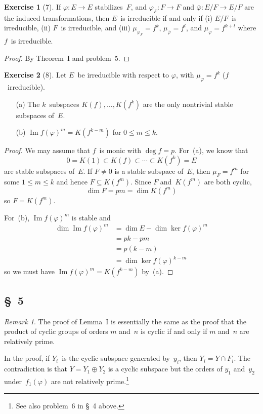 \documentclass[letterpaper,12pt]{article}
\DeclareMathOperator{\im}{Im}
\newcommand{\sect}{\cap}
\newcommand{\dsum}{\oplus}
\newcommand{\proj}[1]{\overline{#1}}
\theoremstyle{definition}
\newtheorem*{exer}{Exercise}
\theoremstyle{remark}
\newtheorem*{rmk}{Remark}
\begin{document}
\begin{exer}[7]
If \(\varphi:E\to E\) stabilizes~\(F\), and \(\varphi_F:F\to F\) and \(\proj{\varphi}:E/F\to E/F\) are the induced transformations, then \(E\)~is irreducible if and only if (i) \(E/F\)~is irreducible, (ii) \(F\)~is irreducible, and (iii) \(\mu_{\varphi_F}=f^k\), \(\mu_{\proj{\varphi}}=f^l\), and \(\mu_{\varphi}=f^{k+l}\) where \(f\)~is irreducible.
\end{exer}
\begin{proof}
By Theorem~I and problem~5.
\end{proof}

\begin{exer}[8]
Let \(E\)~be irreducible with respect to \(\varphi\), with \(\mu_{\varphi}=f^k\) (\(f\)~irreducible).
\begin{enumerate}
\item[(a)] The \(k\)~subspaces \(K(f),\ldots,K(f^k)\) are the only nontrivial stable subspaces of~\(E\).
\item[(b)] \(\im f(\varphi)^m=K(f^{k-m})\) for \(0\le m\le k\).
\end{enumerate}
\end{exer}
\begin{proof}
We may assume that \(f\)~is monic with \(\deg f=p\). For~(a), we know that
\[0=K(1)\subset K(f)\subset\cdots\subset K(f^k)=E\]
are stable subspaces of~\(E\). If \(F\ne 0\) is a stable subspace of~\(E\), then \(\mu_F=f^m\) for some \(1\le m\le k\) and hence \(F\subseteq K(f^m)\). Since \(F\) and~\(K(f^m)\) are both cyclic,
\[\dim F=pm=\dim K(f^m)\]
so \(F=K(f^m)\).

For~(b), \(\im f(\varphi)^m\) is stable and
\begin{align*}
\dim\im f(\varphi)^m&=\dim E-\dim\ker f(\varphi)^m\\
	&=pk-pm\\
	&=p(k-m)\\
	&=\dim\ker f(\varphi)^{k-m}
\end{align*}
so we must have \(\im f(\varphi)^m=K(f^{k-m})\) by~(a).
\end{proof}

\subsection*{\S~5}
\begin{rmk}
The proof of Lemma~I is essentially the same as the proof that the product of cyclic groups of orders \(m\) and~\(n\) is cyclic if and only if \(m\) and~\(n\) are relatively prime.

In the proof, if \(Y_i\)~is the cyclic subspace generated by~\(y_i\), then \(Y_i=Y\sect F_i\). The contradiction is that \(Y=Y_1\dsum Y_2\) is a cyclic subspace but the orders of \(y_1\) and~\(y_2\) under~\(f_1(\varphi)\) are not relatively prime.\footnote{See also problem~6 in \S~4 above.}
\end{rmk}
\end{document}

